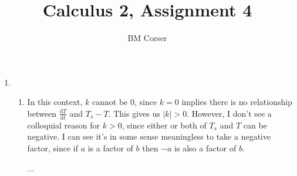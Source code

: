 \documentclass[10pt]{article}
\author{BM Corser}
\title{Calculus 2, Assignment 4}
\newcommand*{\dTdt}[0]{\frac{\text{d}T}{\text{d}t}}
\begin{document}
    \maketitle 
    \begin{enumerate}
        \item 
        \begin{enumerate}
            \item In this context, $k$ cannot be 0, since $k = 0$ implies there
                is no relationship between $\dTdt$ and $T_s - T$. This gives us
                $|k| > 0$. However, I don't see a colloquial reason for $k >
                0$, since either or both of $T_s$ and $T$ can be negative. I
                can see it's in some sense meaningless to take a negative
                factor, since if $a$ is a factor of $b$ then $-a$ is also a
                factor of $b$.

                ...


\end{enumerate}
\end{enumerate}
\end{document}
